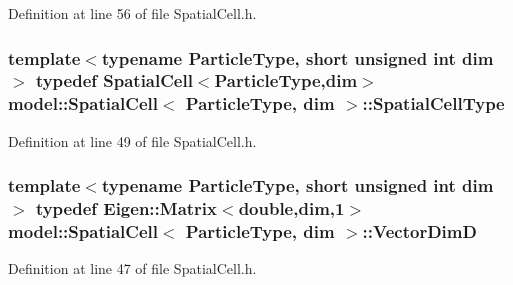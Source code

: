 Definition at line 56 of file Spatial\+Cell.\+h.

\hypertarget{structmodel_1_1_spatial_cell_a21ae9e280e12b732db8ac384d6fb587c}{}
\subsubsection[{Spatial\+Cell\+Type}]{\setlength{\rightskip}{0pt plus 5cm}template$<$typename Particle\+Type, short unsigned int dim$>$ typedef {\bf Spatial\+Cell}$<$Particle\+Type,{\bf dim}$>$ {\bf model\+::\+Spatial\+Cell}$<$ Particle\+Type, {\bf dim} $>$\+::{\bf Spatial\+Cell\+Type}}\label{structmodel_1_1_spatial_cell_a21ae9e280e12b732db8ac384d6fb587c}


Definition at line 49 of file Spatial\+Cell.\+h.

\hypertarget{structmodel_1_1_spatial_cell_aeaaeb951297c67dde8b981038936d7b8}{}
\subsubsection[{Vector\+Dim\+D}]{\setlength{\rightskip}{0pt plus 5cm}template$<$typename Particle\+Type, short unsigned int dim$>$ typedef Eigen\+::\+Matrix$<$double,{\bf dim},1$>$ {\bf model\+::\+Spatial\+Cell}$<$ Particle\+Type, {\bf dim} $>$\+::{\bf Vector\+Dim\+D}}\label{structmodel_1_1_spatial_cell_aeaaeb951297c67dde8b981038936d7b8}


Definition at line 47 of file Spatial\+Cell.\+h.



